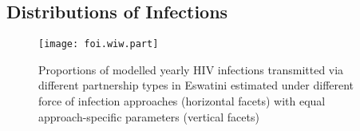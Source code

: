 \subsection{Distributions of Infections}\label{sr.foi.exp}
\begin{figure}
  \texttt{[image: foi.wiw.part]}
  \caption{Proportions of modelled yearly HIV infections
    transmitted via different partnership types in Eswatini
    estimated under different force of infection approaches (horizontal facets)
    with equal \vs approach-specific parameters (vertical facets)}
  \label{fig:foi.wiw.part}
\end{figure}
